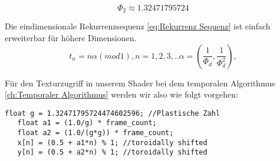 \begin{equation}\label{eq:plastische Zahl}
    \Phi_{2} \approx 1.32471795724
\end{equation}

Die eindimensionale Rekurrenzsequenz \ref{eq:Rekurrenz Sequenz} ist einfach erweiterbar 
für höhere Dimensionen.
\begin{equation}\label{eq:1 zu N - Dimensional}
    t_{n} = n\alpha(mod 1), n = 1,2,3,..
    \alpha = (\frac{1}{\Phi_{d}}, \frac{1}{\Phi_{d}^{2}}),
\end{equation}

Für den Texturzugriff in unserem Shader bei dem temporalen Algorithmus \ref{ch:Temporaler Algorithmus}
werden wir also wie folgt vorgehen:

\begin{lstlisting}[style=CStyle]
   float g = 1.32471795724474602596; //Plastische Zahl
   float a1 = (1.0/g) * frame_count;
   float a2 = (1.0/(g*g)) * frame_count;
   x[n] = (0.5 + a1*n) % 1; //toroidally shifted
   y[n] = (0.5 + a2*n) % 1; //toroidally shifted
\end{lstlisting}





